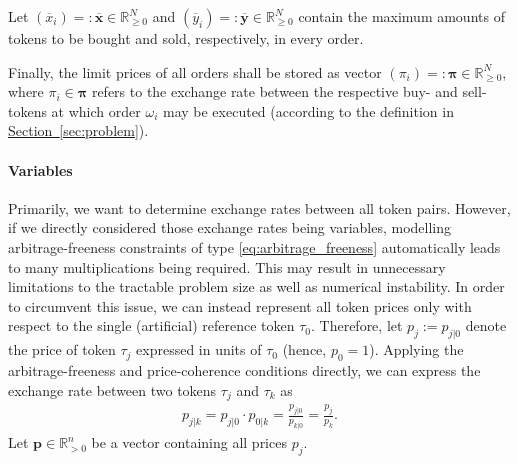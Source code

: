 \documentclass[11pt,parskip=full]{scrartcl}%
\newcommand*{\subsecref}[1]{\hyperref[{#1}]{Section~\ref*{#1}}}
\begin{document}
Let $ (\overline{x}_i) =: \overline{\mathbf{x}} \in \mathbb{R}^N_{\ge 0} $ and 
$ (\overline{y}_i) =: \overline{\mathbf{y}} \in \mathbb{R}^N_{\ge 0} $ contain the maximum amounts
of tokens to be bought and sold, respectively, in every order.

Finally, the limit prices of all orders shall be stored as vector
$ (\pi_i) =: \bm{\pi} \in \mathbb{R}^N_{\ge 0} $, where $ \pi_i \in \bm{\pi} $ refers to the
exchange rate between the respective buy- and sell-tokens at which order $ \omega_i $ may be
executed (according to the definition in \subsecref{sec:problem}).

\vspace{-.2cm}
\paragraph{Variables}

Primarily, we want to determine exchange rates between all token pairs.
However, if we directly considered those exchange rates being variables, modelling
arbitrage-freeness constraints of type \eqref{eq:arbitrage_freeness} automatically leads to many
multiplications being required.
This may result in unnecessary limitations to the tractable problem size as well as numerical
instability.
In order to circumvent this issue, we can instead represent all token prices only with respect to
the single (artificial) reference token $ \tau_0 $.
Therefore, let $ p_j := p_{j|0} $ denote the price of token $ \tau_j $ expressed in units of
$ \tau_0 $ (hence, $ p_0 = 1 $).
Applying the arbitrage-freeness and price-coherence conditions directly, we can express the
exchange rate between two tokens $ \tau_j $ and $ \tau_k $ as
\begin{align}
  p_{j|k} = p_{j|0} \cdot p_{0|k} = \frac{p_{j|0}}{p_{k|0}} = \frac{p_j}{p_k}.
  \label{eq:price_decomposition}
\end{align}
Let $ \mathbf{p} \in \mathbb{R}^n_{> 0} $ be a vector containing all prices $ p_j $.
\end{document}
